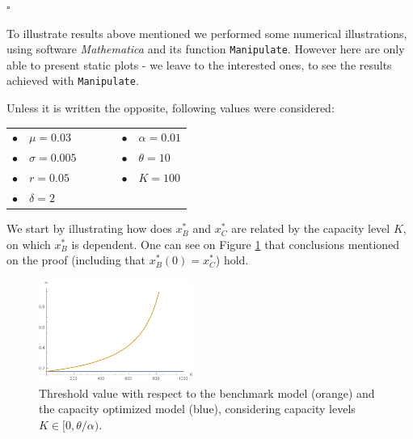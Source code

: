  
 
 
\begin{flushright}
 $\square$
\end{flushright}



To illustrate results above mentioned we performed some numerical illustrations, using software \textit{Mathematica} and its function \texttt{Manipulate}. However here are only able to present static plots - we leave to the interested ones, to see the results achieved with \texttt{Manipulate}.

Unless it is written the opposite, following values were considered:


\begin{table}[!htb]
	\centering
	\begin{tabular}{lllllll}
		 $\bullet$ & $\mu=0.03$     &  & \hspace{7cm} &  &  $\bullet$ & $\alpha=0.01$ \\
		 $\bullet$ & $\sigma=0.005$ &  & \hspace{7cm} &  &  $\bullet$ & $\theta=10$   \\
		 $\bullet$ & $r=0.05$       &  & \hspace{7cm} &  &  $\bullet$ & $K=100$       \\
		 $\bullet$ & $\delta=2$                                
	\end{tabular}
\end{table}



We start by illustrating how does $x^*_B$ and $x^*_C$ are related by the capacity level $K$, on which $x^*_B$ is dependent. One can see on Figure \ref{fig:Kvar} that conclusions mentioned on the proof (including that $x^*_B(0)=x^*_C$) hold.

\begin{figure}[!htb]
	\centering
	\includegraphics[width=0.45\textwidth]{Prob1_CapOpt/xopt_kvar.pdf}
	\caption{Threshold value with respect to the benchmark model (orange) and the capacity optimized model (blue), considering capacity levels $K \in [0, \theta/\alpha)$.}
	\label{fig:Kvar}
\end{figure}


